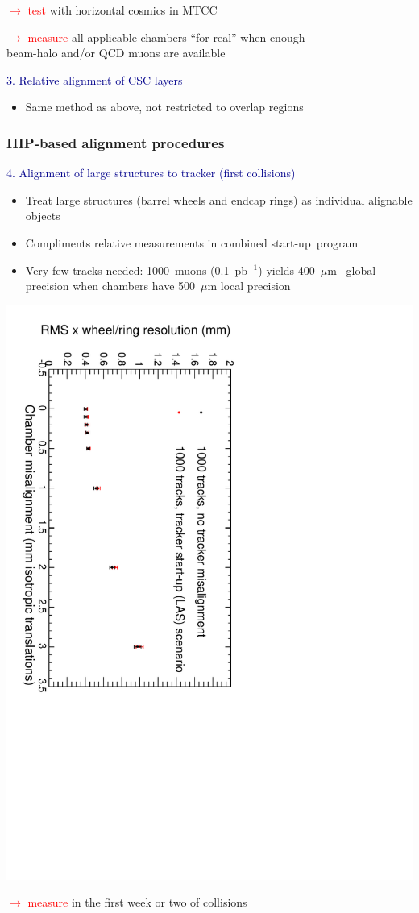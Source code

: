 \documentclass[compress]{beamer}
\begin{document}
\begin{frame}
\textcolor{red}{$\to$ test} with horizontal cosmics in MTCC

\vspace{0.25 cm}
\textcolor{red}{$\to$ measure} all applicable chambers ``for real'' when enough \\ \hfill beam-halo and/or QCD muons are available

\vfill
\textcolor{darkblue}{3. Relative alignment of CSC layers}
\begin{itemize}
\item Same method as above, not restricted to overlap regions
\end{itemize}
\end{frame}

\begin{frame}
\frametitle{HIP-based alignment procedures}
\textcolor{darkblue}{4. Alignment of large structures to tracker (first collisions)}
\begin{itemize}
\item Treat large structures (barrel wheels and endcap rings) as individual alignable objects
\item Compliments relative measurements in combined \mbox{start-up program \hspace{-1 cm}}
\item Very few tracks needed: 1000~muons (0.1~pb$^{-1}$) yields \mbox{400~$\mu$m \hspace{-0.5 cm}} global precision when chambers have 500~$\mu$m local precision
\end{itemize}

\vspace{-0.25 cm}
\begin{center}
\includegraphics[height=0.6\linewidth, angle=90]{vsinternal.pdf}
\end{center}

\vspace{-0.25 cm}
\textcolor{red}{$\to$ measure} in the first week or two of collisions
\end{frame}
\end{document}
